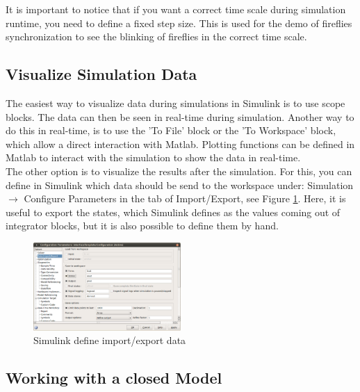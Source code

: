 \documentclass[a4paper,twoside, openright,12pt]{report}
\begin{document}
It is important to notice that if you want a correct time scale during simulation runtime, you need to define a fixed step size. This is used for the demo of fireflies
synchronization to see the blinking of fireflies in the correct time scale.

\subsection{Visualize Simulation Data}

The easiest way to visualize data during simulations in Simulink is to use scope blocks. The data can then be seen in real-time during simulation.
Another way to do this in real-time, is to use the 'To File' block or the 'To Workspace' block, which allow a direct interaction with Matlab. Plotting functions can be defined in Matlab to interact with the simulation
to show the data in real-time.
\\

The other option is to visualize the results after the simulation. For this, you can define in Simulink which data should be send to the workspace under:
Simulation $\rightarrow$ Configure Parameters in the tab of Import/Export, see Figure \ref{simulink2Fig}. Here, it is useful to export the states, which Simulink defines as the 
values coming out of integrator blocks, but it is also possible to define them by hand.

\begin{figure}[htb]
\centering
\includegraphics[width=0.5\textwidth]{pics/screenSim2.eps}
\caption[Simulink define import/export data]{Simulink define import/export data}
\label{simulink2Fig}
\end{figure} 

\subsection{Working with a closed Model}
\end{document}
